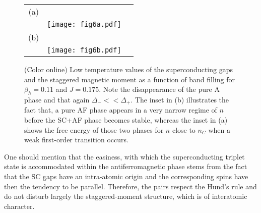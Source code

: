 \documentclass[aps,prb,showpacs,reprint]{revtex4-1}
\begin{document}
\begin{figure}[htpb]
\centering
\begin{tabular}{ccc}
  (a) & & \quad \quad \quad \quad \quad\\
      & \texttt{[image: fig6a.pdf]} & \\
  (b) & & \quad \quad \quad \quad \quad\\
      & \texttt{[image: fig6b.pdf]} &\\
\end{tabular}
\caption{(Color online) Low temperature values of the superconducting gaps
and the staggered
magnetic moment as a function of band filling for $\beta_h=0.11$ and $J=0.175$.
Note the
disappearance of the pure A phase and that again $\Delta_-<<\Delta_+$. The
inset in (b) illustrates the fact that, a pure AF phase appears in a
very narrow regime of $n$ before the SC+AF phase becomes stable, whereas the inset in (a) shows the free energy of those two phases for $n$ close to $n_C$ when a weak first-order transition occurs.}
\label{fig:slice_n_b11}
\end{figure}


One should mention that the easiness, with which the superconducting triplet
state is accommodated within the antiferromagnetic phase stems from the fact
that the SC gaps have an intra-atomic origin and the corresponding spins have
then the tendency to be parallel. Therefore, the pairs
respect the Hund's rule and do not disturb largely the
staggered-moment structure, which is of interatomic character. 
\end{document}
